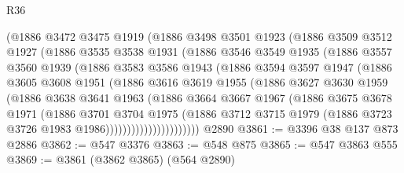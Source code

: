 \begin{lexlean}{R36}
\begin{coremodule}
              (@1886
                @3472
                @3475
                @1919
                (@1886
                  @3498
                  @3501
                  @1923
                  (@1886
                    @3509
                    @3512
                    @1927
                    (@1886
                      @3535
                      @3538
                      @1931
                      (@1886
                        @3546
                        @3549
                        @1935
                        (@1886
                          @3557
                          @3560
                          @1939
                          (@1886
                            @3583
                            @3586
                            @1943
                            (@1886
                              @3594
                              @3597
                              @1947
                              (@1886
                                @3605
                                @3608
                                @1951
                                (@1886
                                  @3616
                                  @3619
                                  @1955
                                  (@1886
                                    @3627
                                    @3630
                                    @1959
                                    (@1886
                                      @3638
                                      @3641
                                      @1963
                                      (@1886
                                        @3664
                                        @3667
                                        @1967
                                        (@1886
                                          @3675
                                          @3678
                                          @1971
                                          (@1886
                                            @3701
                                            @3704
                                            @1975
                                            (@1886
                                              @3712
                                              @3715
                                              @1979
                                              (@1886 @3723 @3726 @1983 @1986))))))))))))))))))))))
    @2890
@3861 := @3396 @38 @137 @873 @2886
@3862 := @547 @3376
@3863 := @548 @875
@3865 := @547 @3863 @555
@3869 := @3861 (@3862 @3865) (@564 @2890)

\end{coremodule}
\end{lexlean}

